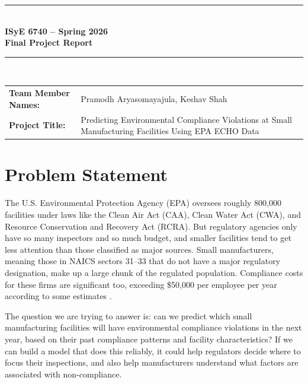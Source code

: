 \documentclass[11pt]{article}
\begin{document}
\begin{titlepage}
	\clearpage\thispagestyle{empty}
	\centering
	\vspace{1cm}

	\rule{\linewidth}{1mm} \\[0.5cm]
	{ \Large \bfseries ISyE 6740 -- Spring 2026\\[0.2cm]
		Final Project Report}\\[0.5cm]
	\rule{\linewidth}{1mm} \\[1cm]

		\begin{tabular}{l p{8cm}}
		\textbf{Team Member Names:} & Pramodh Aryasomayajula, Keshav Shah \\[10pt]
		\textbf{Project Title:} & Predicting Environmental Compliance Violations at Small Manufacturing Facilities Using EPA ECHO Data \\[10pt]
		\end{tabular}

	\pagebreak

\end{titlepage}


\section{Problem Statement}

The U.S. Environmental Protection Agency (EPA) oversees roughly 800,000 facilities under laws like the Clean Air Act (CAA), Clean Water Act (CWA), and Resource Conservation and Recovery Act (RCRA). But regulatory agencies only have so many inspectors and so much budget, and smaller facilities tend to get less attention than those classified as major sources. Small manufacturers, meaning those in NAICS sectors 31--33 that do not have a major regulatory designation, make up a large chunk of the regulated population. Compliance costs for these firms are significant too, exceeding \$50,000 per employee per year according to some estimates \cite{nam2023}.

The question we are trying to answer is: can we predict which small manufacturing facilities will have environmental compliance violations in the next year, based on their past compliance patterns and facility characteristics? If we can build a model that does this reliably, it could help regulators decide where to focus their inspections, and also help manufacturers understand what factors are associated with non-compliance.
\end{document}
